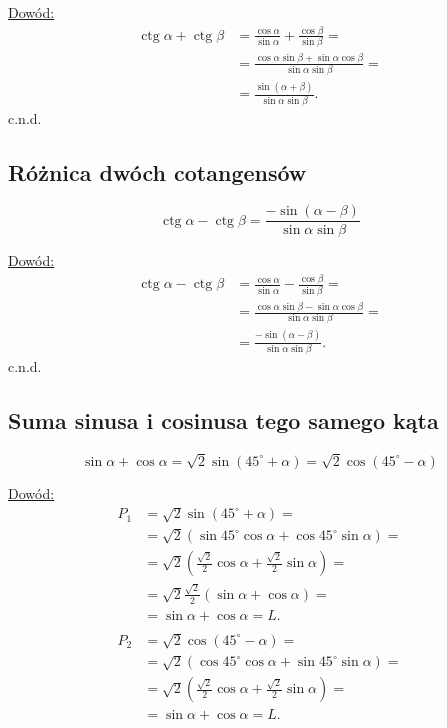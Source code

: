 \documentclass[12pt,a4paper,fleqn]{article}
\DeclareMathOperator{\ctg}{ctg}
\begin{document}
		\underline{Dowód:} \noindent
		\begin{align*}
			\ctg\alpha + \ctg\beta &= \frac{\cos\alpha}{\sin\alpha} + \frac{\cos\beta}{\sin\beta} = \\
			    			  	   &= \frac{\cos\alpha\sin\beta+\sin\alpha\cos\beta}{\sin\alpha\sin\beta} =\\
			    			  	  &=\frac{\sin(\alpha+\beta)}{\sin\alpha\sin\beta}.
		\end{align*}
		c.n.d.
	\subsection{Różnica dwóch cotangensów}
		\begin{equation*}
			\ctg\alpha - \ctg\beta = \frac{-\sin(\alpha-\beta)}{\sin\alpha\sin\beta}
		\end{equation*}
		
		\underline{Dowód:} \noindent
		\begin{align*}
			\ctg\alpha - \ctg\beta &= \frac{\cos\alpha}{\sin\alpha} - \frac{\cos\beta}{\sin\beta} = \\
			    			  	   &= \frac{\cos\alpha\sin\beta-\sin\alpha\cos\beta}{\sin\alpha\sin\beta} =\\
			    			  	  &= \frac{-\sin(\alpha-\beta)}{\sin\alpha\sin\beta}.
		\end{align*}
		c.n.d.	
		
	\subsection{Suma sinusa i cosinusa tego samego kąta}
		\begin{equation*}
			\sin\alpha+\cos\alpha = \sqrt{2}\sin(45^\circ +\alpha) = \sqrt{2}\cos(45^\circ - \alpha)
		\end{equation*}
		
		\underline{Dowód:} \noindent
		\begin{align*}
			P_1&=\sqrt{2}\sin(45^\circ +\alpha) = \\
			   &=\sqrt{2}(\sin45^\circ\cos\alpha+\cos45^\circ\sin\alpha)=\\
			   &=\sqrt{2}(\frac{\sqrt{2}}{2}\cos\alpha+\frac{\sqrt{2}}{2}\sin\alpha)=\\
			   &=\sqrt{2}\frac{\sqrt{2}}{2}(\sin\alpha+ \cos\alpha)=\\
			   &=\sin\alpha+ \cos\alpha = L.
			   \\
			   \\
			P_2 &= \sqrt{2}\cos(45^\circ - \alpha) = \\
				&=  \sqrt{2}(\cos45^\circ\cos\alpha + \sin45^\circ\sin\alpha) =\\
				&=  \sqrt{2}(\frac{\sqrt{2}}{2}\cos\alpha + \frac{\sqrt{2}}{2}\sin\alpha) = \\
				&=\sin\alpha+\cos\alpha=L.
		\end{align*}
\end{document}
